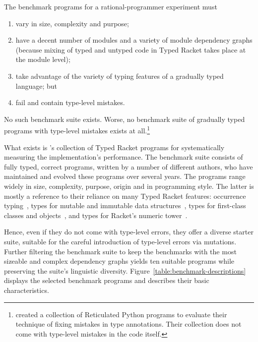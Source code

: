 
The benchmark programs for a rational-programmer experiment must 
\begin{enumerate}
   
\item vary in size, complexity and purpose; 
    
\item have a decent number of modules and a variety of module dependency graphs
 (because mixing of typed and untyped code in Typed Racket takes place at the
 module level);

\item take advantage of the variety of typing features of a gradually typed
 language; but

\item fail and contain type-level mistakes. 
\end{enumerate}
No such benchmark suite exists.  Worse, no benchmark suite of
gradually typed programs with type-level mistakes exists at
all.\footnote{\citet{cc-oopsla-20} created a collection of Reticulated
Python programs to evaluate their technique of fixing mistakes in type
annotations. Their collection does not come with type-level mistakes
in the code itself.} 

What exists is \citet{gtnffvf-jfp-2019}'s collection of Typed Racket programs
for systematically measuring the implementation's performance. The benchmark
suite consists of fully typed, correct programs, written by a number of
different authors, who have maintained and evolved these programs over several
years. The programs range widely in size, complexity, purpose, origin and in
programming style. The latter is mostly a reference to their reliance on many
Typed Racket features: occurrence typing~\citep{tf-icfp-2010}, types for mutable
and immutable data structures~\citep{hpst-sfp-2010}, types for first-class
classes and objects~\citep{tsdtf-oopsla-2012}, and types for Racket's numeric
tower~\citep{stathff-padl-12}.

Hence, even if they do not come with type-level errors, they offer a diverse
starter suite, suitable for the careful introduction of type-level errors via
mutations. Further filtering the benchmark suite to keep the benchmarks with the
most sizeable and complex dependency graphs yields ten suitable programs while
preserving the suite's linguistic diversity. Figure~\ref{table:benchmark-descriptions} displays the selected
benchmark programs and describes their basic characteristics.
